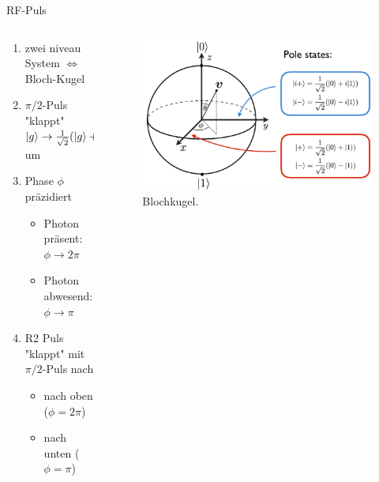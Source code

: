 \documentclass{beamer}
\begin{document}
\begin{frame}{RF-Puls}
	\begin{columns}
		\begin{column}{0.5\textwidth}
			\begin{enumerate}
				\item zwei niveau System $\Leftrightarrow$ Bloch-Kugel
				\item $\pi/2$-Puls "klappt" $\ket{g}\rightarrow\frac{1}{\sqrt{2}}(\ket{g}+\ket{e})$ um
				\item Phase $\phi$ präzidiert
				      \begin{itemize}
					      \item Photon präsent: $\phi\rightarrow2\pi$
					      \item Photon abwesend: $\phi\rightarrow\pi$
				      \end{itemize}
				\item R2 Puls "klappt" mit $\pi/2$-Puls nach
				      \begin{itemize}
					      \item nach oben ($\phi=2\pi$)
					      \item nach unten ($\phi=\pi$)
				      \end{itemize}
			\end{enumerate}
		\end{column}
		\begin{column}{0.5\textwidth}
			\begin{figure}
				\center\includegraphics[width=1\textwidth]{images/blochkugel.png}
				\caption{Blochkugel\cite{qi}.}
			\end{figure}
		\end{column}
	\end{columns}
\end{frame}
\end{document}
